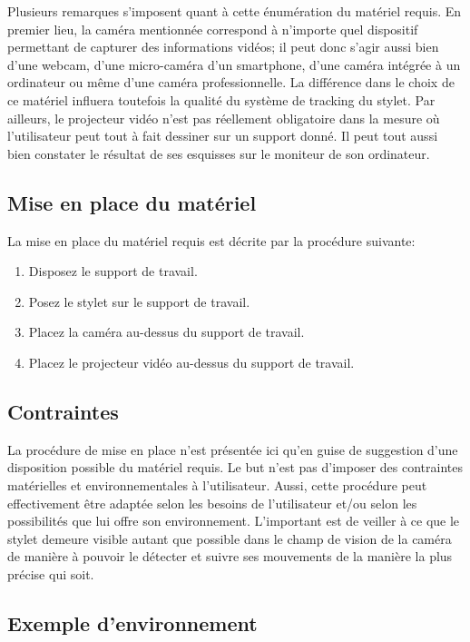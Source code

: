 \documentclass[11pt,a4paper,oldfontcommands]{memoir}
\begin{document}
Plusieurs remarques s'imposent quant à cette énumération du matériel requis. En premier lieu, la caméra mentionnée correspond à n'importe quel dispositif permettant de capturer des informations vidéos; il peut donc s'agir aussi bien d'une webcam, d'une micro-caméra d'un smartphone, d'une caméra intégrée à un ordinateur ou même d'une caméra professionnelle. La différence dans le choix de ce matériel influera toutefois la qualité du système de tracking du stylet. Par ailleurs, le projecteur vidéo n'est pas réellement obligatoire dans la mesure où l'utilisateur peut tout à fait dessiner sur un support donné. Il peut tout aussi bien constater le résultat de ses esquisses sur le moniteur de son ordinateur.

\subsection{Mise en place du matériel}

La mise en place du matériel requis est décrite par la procédure suivante:

\begin{enumerate}
\item Disposez le support de travail.
\item Posez le stylet sur le support de travail.
\item Placez la caméra au-dessus du support de travail.
\item Placez le projecteur vidéo au-dessus du support de travail.
\end{enumerate}

\subsection{Contraintes}

La procédure de mise en place n'est présentée ici qu'en guise de suggestion d'une disposition possible du matériel requis. Le but n'est pas d'imposer des contraintes matérielles et environnementales à l'utilisateur. Aussi, cette procédure peut effectivement être adaptée selon les besoins de l'utilisateur et/ou selon les possibilités que lui offre son environnement. L'important est de veiller à ce que le stylet demeure visible autant que possible dans le champ de vision de la caméra de manière à pouvoir le détecter et suivre ses mouvements de la manière la plus précise qui soit.

\subsection{Exemple d'environnement}
\end{document}
